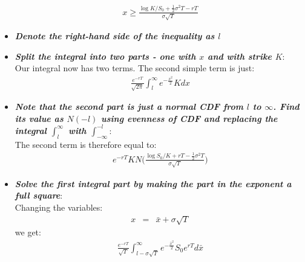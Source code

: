 \begin{itemize}
	\begin{eqnarray}
	x \geq \frac{\log{K/S_{0}} + \frac{1}{2}\sigma^{2}T - rT}{\sigma\sqrt{T}}
	\end{eqnarray}
	\item \textbf{\textit{Denote the right-hand side of the inequality as $l$}}
	\item \textbf{\textit{Split the integral into two parts - one with $x$ and with strike $K$}}:\\
	Our integral now has two terms. The second simple term is just:
	\begin{eqnarray}
		\frac{e^{-rT}}{\sqrt{2\pi}}\int_{l}^{\infty}{e^{-\frac{x^{2}}{2}}Kdx}
	\end{eqnarray}
	\item \textbf{\textit{Note that the second part is just a normal CDF from $l$ to $\infty$. Find its value as $N(-l)$ using evenness of CDF and replacing the integral $\int_{l}^{\infty}$ with $\int_{-\infty}^{-l}$}}:\\
	The second term is therefore equal to:
	\begin{eqnarray}
		e^{-rT}KN\Bigg(\frac{\log{S_{0}/K}+rT-\frac{1}{2}\sigma^{2}T}{\sigma\sqrt{T}}\Bigg)
	\end{eqnarray}
	\item \textbf{\textit{Solve the first integral part by making the part in the exponent a full square}}:\\
	Changing the variables:
	\begin{eqnarray}
	x &=& \bar x + \sigma\sqrt{T}
	\end{eqnarray}
	we get:
	\begin{eqnarray}
	\frac{e^{-rT}}{\sqrt{T}}\int_{l - \sigma\sqrt{T}}^{\infty}{e^{-\frac{\bar x^{2}}{2}}S_{0}e^{rT}d\bar{x}}
	\end{eqnarray}
\end{itemize}